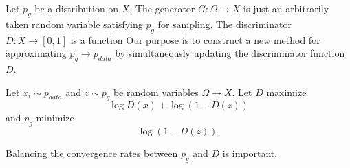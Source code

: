 \documentclass{../exp}
\begin{document}
Let $p_g$ be a distribution on $X$.
The generator $G:\Omega\to X$ is just an arbitrarily taken random variable satisfying $p_g$ for sampling.
The discriminator $D:X\to[0,1]$ is a function
Our purpose is to construct a new method for approximating $p_g\to p_{data}$ by simultaneously updating the discriminator function $D$.

Let $x_i\sim p_{data}$ and $z\sim p_g$ be random variables $\Omega\to X$.
Let $D$ maximize
\[\log D(x)+\log(1-D(z))\]
and $p_g$ minimize
\[\log(1-D(z)).\]


Balancing the convergence rates between $p_g$ and $D$ is important.
\end{document}
